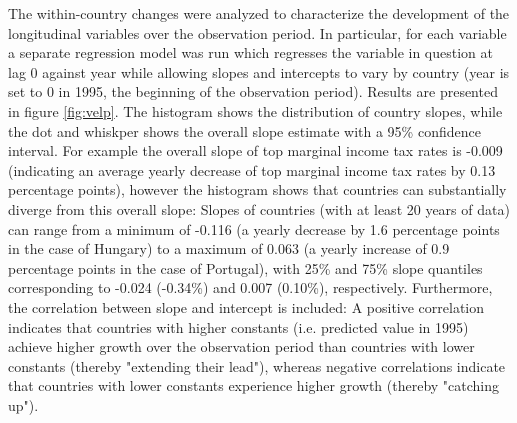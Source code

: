 \documentclass[11pt]{article}
\begin{document}
The within-country changes were analyzed to characterize the development of the longitudinal variables over the observation period.
In particular, for each variable a separate regression model was run which regresses the variable in question at lag 0 against year while allowing slopes and intercepts to vary by country (year is set to 0 in 1995, the beginning of the observation period).
Results are presented in figure \ref{fig:velp}.
The histogram shows the distribution of country slopes, while the dot and whiskper shows the overall slope estimate with a 95\% confidence interval.
For example the overall slope of top marginal income tax rates is -0.009 (indicating an average yearly decrease of top marginal income tax rates by 0.13 percentage points), however the histogram shows that countries can substantially diverge from this overall slope: 
Slopes of countries (with at least 20 years of data) can range from a minimum of -0.116 (a yearly decrease by 1.6 percentage points in the case of Hungary) to a maximum of 0.063 (a yearly increase of 0.9 percentage points in the case of Portugal), with 25\% and 75\% slope quantiles corresponding to -0.024 (-0.34\%) and 0.007 (0.10\%), respectively.
Furthermore, the correlation between slope and intercept is included:
A positive correlation indicates that countries with higher constants (i.e. predicted value in 1995) achieve higher growth over the observation period than countries with lower constants (thereby "extending their lead"), whereas negative correlations indicate that countries with lower constants experience higher growth (thereby "catching up").
\end{document}

